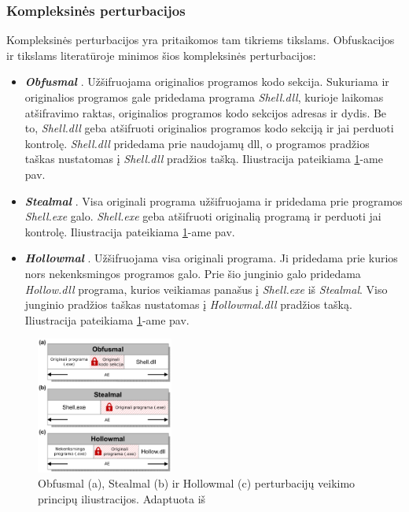 \subsubsection{Kompleksinės perturbacijos}\label{sec:literature:perturbations:complex}
Kompleksinės perturbacijos yra pritaikomos tam tikriems tikslams. Obfuskacijos ir  tikslams literatūroje minimos šios kompleksinės perturbacijos:
\begin{itemize}
    \item \textbf{\textit{Obfusmal}} \cite{zhongMalFoxCamouflagedAdversarial2024}. Užšifruojama originalios programos kodo sekcija. Sukuriama ir originalios programos gale pridedama programa \textit{Shell.dll}, kurioje laikomas atšifravimo raktas, originalios programos kodo sekcijos adresas ir dydis. Be to, \textit{Shell.dll} geba atšifruoti originalios programos kodo sekciją ir jai perduoti kontrolę. \textit{Shell.dll} pridedama prie naudojamų \acs{dll}, o programos pradžios taškas nustatomas į \textit{Shell.dll} pradžios tašką. Iliustracija pateikiama \ref{fig:perturbations}-ame pav.
    \item \textbf{\textit{Stealmal}} \cite{zhongMalFoxCamouflagedAdversarial2024}. Visa originali programa užšifruojama ir pridedama prie programos \textit{Shell.exe} galo. \textit{Shell.exe} geba atšifruoti originalią programą ir perduoti jai kontrolę. Iliustracija pateikiama \ref{fig:perturbations}-ame pav.
    \item \textbf{\textit{Hollowmal}} \cite{zhongMalFoxCamouflagedAdversarial2024}. Užšifruojama visa originali programa. Ji pridedama prie kurios nors nekenksmingos programos galo. Prie šio junginio galo pridedama \textit{Hollow.dll} programa, kurios veikiamas panašus į \textit{Shell.exe} iš \textit{Stealmal}. Viso junginio pradžios taškas nustatomas į \textit{Hollowmal.dll} pradžios tašką. Iliustracija pateikiama \ref{fig:perturbations}-ame pav.
\end{itemize}

\begin{figure}[h]
    \begin{small}
        \begin{center}
            \includegraphics[width=0.4\textwidth]{img/complex-perturbations.png}
        \end{center}
        \caption{Obfusmal (a), Stealmal (b) ir Hollowmal (c) perturbacijų veikimo principų iliustracijos. Adaptuota iš \cite{zhongReinforcementLearningBased2022}}\label{fig:perturbations}
    \end{small}
\end{figure}
\clearpage